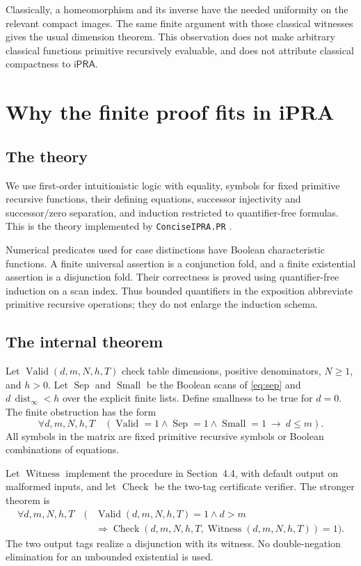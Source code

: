 \documentclass[11pt,a4paper]{article}
\theoremstyle{definition}
\newcommand{\ipra}{\mathsf{iPRA}}
\newcommand{\dist}{\operatorname{dist}_{\infty}}
\newcommand{\Valid}{\operatorname{Valid}}
\newcommand{\Sep}{\operatorname{Sep}}\newcommand{\Small}{\operatorname{Small}}
\newcommand{\CheckCert}{\operatorname{Check}}\newcommand{\Witness}{\operatorname{Witness}}
\begin{document}
Classically, a homeomorphism and its inverse have the needed
uniformity on the relevant compact images. The same finite
argument with those classical witnesses gives the usual
dimension theorem. This observation does not make arbitrary
classical functions primitive recursively evaluable, and
does not attribute classical compactness to $\ipra$.

\section{Why the finite proof fits in iPRA}\label{sec:ipra}
\subsection{The theory}
We use first-order intuitionistic logic with equality, symbols
for fixed primitive recursive functions, their defining
equations, successor injectivity and successor/zero separation,
and induction restricted to quantifier-free formulas.
This is the theory implemented by
\texttt{ConciseIPRA.PR} \cite{proveit-pr}.

Numerical predicates used for case distinctions have Boolean
characteristic functions. A finite universal assertion is a
conjunction fold, and a finite existential assertion is a
disjunction fold. Their correctness is proved using
quantifier-free induction on a scan index.
Thus bounded quantifiers in the exposition abbreviate
primitive recursive operations; they do not enlarge the
induction schema.

\subsection{The internal theorem}
Let $\Valid(d,m,N,h,T)$ check table dimensions, positive
denominators, $N\geq1$, and $h>0$. Let $\Sep$ and $\Small$
be the Boolean scans of \eqref{eq:sep} and $d\,\dist<h$
over the explicit finite lists. Define smallness to be true
for $d=0$. The finite obstruction has the form
\begin{equation}\label{eq:internal}
 \forall d,m,N,h,T\quad
  (\Valid=1\wedge\Sep=1\wedge\Small=1
                         \ \longrightarrow\ d\leq m).
\end{equation}
All symbols in the matrix are fixed primitive recursive
symbols or Boolean combinations of equations.

Let $\Witness$ implement the procedure in Section~4.4,
with default output on malformed inputs, and let $\CheckCert$
be the two-tag certificate verifier. The stronger theorem is
\begin{equation}\label{eq:internal-witness}
\begin{split}
 \forall d,m,N,h,T\quad
 (&\Valid(d,m,N,h,T)=1\wedge d>m\\
  &\Longrightarrow
  \CheckCert(d,m,N,h,T,\Witness(d,m,N,h,T))=1).
\end{split}
\end{equation}
The two output tags realize a disjunction with its witness.
No double-negation elimination for an unbounded existential
is used.
\end{document}
